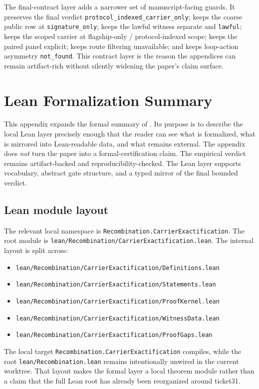 \documentclass[11pt]{article}
\theoremstyle{definition}
\begin{document}
The final-contract layer adds a narrower set of manuscript-facing guards. It preserves the
final verdict \texttt{protocol\_indexed\_carrier\_only}; keeps the coarse public row at
\texttt{signature\_only}; keeps the lawful witness separate and \texttt{lawful}; keeps the
scoped carrier at flagship-only / protocol-indexed scope; keeps the paired panel explicit;
keeps route filtering unavailable; and keeps loop-action asymmetry
\texttt{not\_found}. This contract layer is the reason the appendices can remain
artifact-rich without silently widening the paper's claim surface.
 \section{Lean Formalization Summary}
\label{app:lean-formalization-summary}

This appendix expands the formal summary of
. Its purpose is to describe the local Lean
layer precisely enough that the reader can see what is formalized, what is mirrored into
Lean-readable data, and what remains external. The appendix does \emph{not} turn the paper
into a formal-certification claim. The empirical verdict remains artifact-backed and
reproducibility-checked. The Lean layer supports vocabulary, abstract gate structure, and a
typed mirror of the final bounded verdict.

\subsection{Lean module layout}

The relevant local namespace is \texttt{Recombination.CarrierExactification}. The root
module is \nolinkurl{lean/Recombination/CarrierExactification.lean}. The internal layout is
split across:
\begin{itemize}[leftmargin=*]
\item \nolinkurl{lean/Recombination/CarrierExactification/Definitions.lean}
\item \nolinkurl{lean/Recombination/CarrierExactification/Statements.lean}
\item \nolinkurl{lean/Recombination/CarrierExactification/ProofKernel.lean}
\item \nolinkurl{lean/Recombination/CarrierExactification/WitnessData.lean}
\item \nolinkurl{lean/Recombination/CarrierExactification/ProofGaps.lean}
\end{itemize}

The local target \texttt{Recombination.CarrierExactification} compiles, while the root
\nolinkurl{lean/Recombination.lean} remains intentionally unwired in the current worktree.
That layout makes the formal layer a local theorem module rather than a claim that the full
Lean root has already been reorganized around ticket31.
\end{document}
